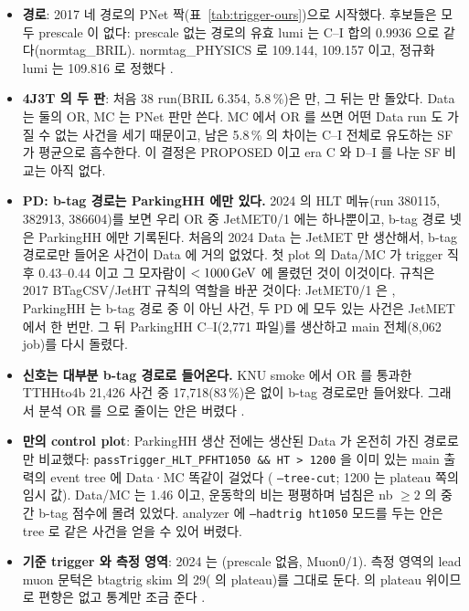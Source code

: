 \begin{itemize}
\item \textbf{경로}: 2017 네 경로의 PNet 짝(표~\ref{tab:trigger-ours})으로 시작했다. 후보들은 모두 prescale 이 없다: prescale 없는 경로의
  유효 lumi 는 C--I 합의 0.9936 으로 같다(normtag\_BRIL)\tagrunthree.
  normtag\_PHYSICS 로  109.144,  109.157\fbinv{} 이고, 정규화 lumi 는 109.816\fbinv{} 로 정했다
  .
\item \textbf{4J3T 의 두 판}: 처음 38 run(BRIL 6.354\fbinv, 5.8\,\%)은  만, 그 뒤는
   만 돌았다. Data 는 둘의 OR, MC 는 PNet 판만 쓴다. MC 에서 OR 를 쓰면 어떤 Data run 도 가질 수 없는 사건을
  세기 때문이고, 남은 5.8\,\% 의 차이는 C--I 전체로 유도하는 SF 가 평균으로 흡수한다\tagrunthree.
  이 결정은 PROPOSED 이고 era C 와 D--I 를 나눈 SF 비교는 아직 없다.
\item \textbf{PD: b-tag 경로는 ParkingHH 에만 있다.} 2024 의 HLT 메뉴(run 380115, 382913, 386604)를 보면 우리 OR 중 JetMET0/1 에는
   하나뿐이고, b-tag 경로 넷은 ParkingHH 에만 기록된다. 처음의 2024 Data 는
  JetMET 만 생산해서, b-tag 경로로만 들어온 사건이 Data 에 거의 없었다. 첫 plot 의 Data/MC 가 trigger 직후 0.43–0.44 이고 그 모자람이
  \HT{} $<1000\,\mathrm{GeV}$ 에 몰렸던 것이 이것이다. 규칙은 2017 BTagCSV/JetHT 규칙의 역할을 바꾼 것이다:
  JetMET0/1 은 , ParkingHH 는 b-tag 경로 중  이 아닌 사건, 두 PD 에 모두 있는 사건은 JetMET 에서
  한 번만. 그 뒤 ParkingHH C--I(2,771 파일)를 생산하고 main 전체(8,062 job)를 다시 돌렸다\tagrunthree\tagimpl.
\item \textbf{신호는 대부분 b-tag 경로로 들어온다.} KNU smoke 에서 OR 를 통과한 TTHHto4b 21,426 사건 중 17,718(83\,\%)은
   없이 b-tag 경로로만 들어왔다. 그래서 분석 OR 를  으로 줄이는 안은 버렸다
  .
\item \textbf{ 만의 control plot}: ParkingHH 생산 전에는 생산된 Data 가 온전히 가진 경로로만 비교했다:
  \texttt{passTrigger\_HLT\_PFHT1050 \&\& HT > 1200} 을 이미 있는 main 출력의 event tree 에 Data·MC 똑같이 걸었다
  ( \texttt{--tree-cut}; 1200\GeV{} 는 plateau 쪽의 임시 값). Data/MC 는 1.46 이고, 운동학의 비는 평평하며
  넘침은 nb $\geq 2$ 의 중간 b-tag 점수에 몰려 있었다. analyzer 에 \texttt{--hadtrig ht1050} 모드를 두는 안은 tree 로
  같은 사건을 얻을 수 있어 버렸다.
\item \textbf{기준 trigger 와 측정 영역}: 2024 는 (prescale 없음, Muon0/1). 측정 영역의 lead muon 문턱은 btagtrig skim 의
  29\GeV( 의 plateau)를 그대로 둔다.  의 plateau 위이므로 편향은 없고 통계만 조금 준다
  \tagrunthree.
\end{itemize}

